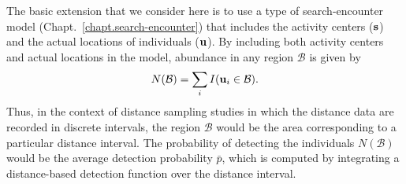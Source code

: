 
The basic extension that we consider here is to use a type of
search-encounter model (Chapt.~\ref{chapt.search-encounter}) that
includes the activity centers ($\bf s$) and the
actual locations of individuals ($\bf u$).
By including both activity centers and actual locations
in the model, abundance in any region
$\mathcal{B}$ is given by
\begin{equation}
N(\mathcal{B}) = \sum_i I({\bf u}_i \in \mathcal{B}).
\label{unmarked.eq.B}
\end{equation}
Thus, in the context of distance sampling studies in which the
distance data are recorded in discrete intervals, the region
$\mathcal{B}$ would be the area corresponding to a particular distance
interval. The probability of detecting the individuals
$N(\mathcal{B})$ would be the average detection probability $\bar{p}$,
which is computed by integrating a distance-based detection function
over the distance interval.

